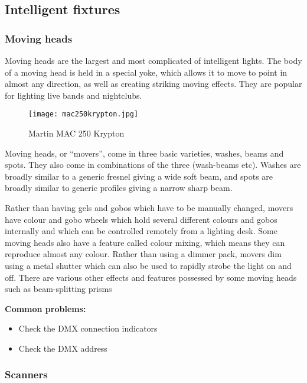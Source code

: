 \documentclass[14pt]{article} %
\let\Oldsubsection\subsection
\renewcommand{\subsection}{\FloatBarrier\Oldsubsection}
\let\Oldsubsubsection\subsubsection
\renewcommand{\subsubsection}{\FloatBarrier\Oldsubsubsection}
\begin{document}
\subsection{Intelligent fixtures}

\subsubsection{Moving heads}

Moving heads are the largest and most complicated of intelligent lights. The body of a moving head is held in a special yoke, which allows it to move to point in almost any direction, as well as creating striking moving effects.	They are popular for lighting live bands and nightclubs.

\begin{figure*}[h]
\begin{center}

\texttt{[image: mac250krypton.jpg]}
\caption{Martin MAC 250 Krypton}
\label{fig:krypton}

\end{center}
\end{figure*}


Moving heads, or “movers”, come in three basic varieties, washes, beams and spots. They also come in combinations of the three (wash-beams etc). Washes are broadly similar to a generic fresnel giving a wide soft beam, and spots are broadly similar to generic profiles giving a narrow sharp beam.

Rather than having gels and gobos which have to be manually changed, movers have colour and gobo wheels which hold several different colours and gobos internally and which can be controlled remotely from a lighting desk. Some moving heads also have a feature called colour mixing, which means they can reproduce almost any colour. Rather than using a dimmer pack, movers dim using a metal shutter which can also be used to rapidly strobe the light on and off. There are various other effects and features possessed by some moving heads such as beam-splitting prisms

\textbf{Common problems:}

\begin{itemize}
\item Check the DMX connection indicators
\item Check the DMX address
\end{itemize}

\subsubsection{Scanners}
\end{document}
